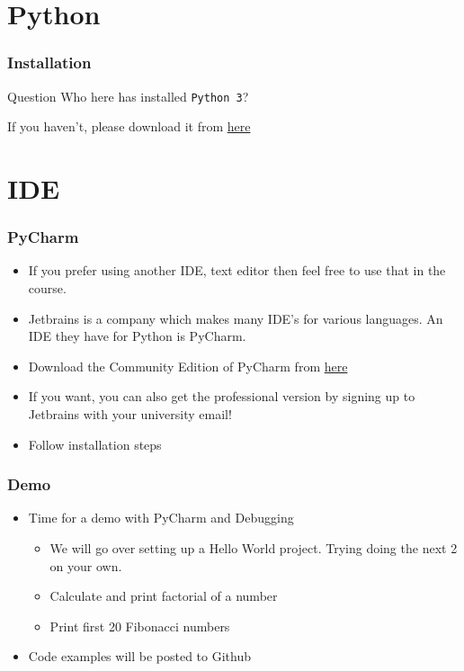 \documentclass{beamer}
\begin{document}
\section{Python}
\begin{frame}
  \frametitle{Installation}
  \begin{block}{Question}
  	Who here has installed \texttt{Python 3}?    
  \end{block}
  \pause
  If you haven't, please download it from \href{https://www.python.org/downloads/}{here} 
\end{frame}
\section{IDE}
\begin{frame}
  \frametitle{PyCharm}
  \begin{itemize}
  	\item If you prefer using another IDE, text editor then feel free to use that in the course.
  	\item Jetbrains is a company which makes many IDE's for various languages. An IDE they have for Python is PyCharm.
    \item Download the Community Edition of PyCharm from \href{https://www.jetbrains.com/pycharm/}{here}
    \item If you want, you can also get the professional version by signing up to Jetbrains with your university email!
    \item Follow installation steps
   \end{itemize}
\end{frame}
\begin{frame}
  \frametitle{Demo}
  \begin{itemize}
  	\item Time for a demo with PyCharm and Debugging
  		\begin{itemize}
  			\item We will go over setting up a Hello World project. Trying doing the next 2 on your own.
  			\item Calculate and print factorial of a number
  			\item Print first 20 Fibonacci numbers
  		\end{itemize}
  	\item Code examples will be posted to Github
  \end{itemize}
   \end{frame}
\end{document}
